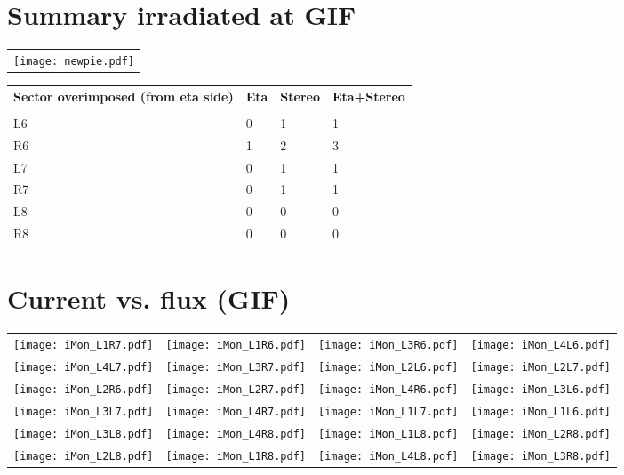 \documentclass{article}%
\begin{document}
%
\section*{Summary irradiated at GIF}%
\label{sec:Summary irradiated at GIF}%
\begin{longtabu}{X[c]}%
\texttt{[image: newpie.pdf]}\\%
\end{longtabu}%
\renewcommand{\arraystretch}{1.5}%
\begin{longtabu}{X[l] X[r] X[r] X[r]}%
%
\textbf{Sector overimposed (from eta side)}&\textbf{Eta}&\textbf{Stereo}&\textbf{Eta+Stereo}\\%
&&&\\%
\hline%
%
L6&0&1&1\\%
R6&1&2&3\\%
%
L7&0&1&1\\%
R7&0&1&1\\%
%
L8&0&0&0\\%
R8&0&0&0\\%
\end{longtabu}

%
\newpage%
\section*{Current vs. flux (GIF)}%
\label{sec:Current vs. flux (GIF)}%
\begin{longtabu}{X[c] X[c] X[c] X[c]}%
\texttt{[image: iMon\_L1R7.pdf]}&\texttt{[image: iMon\_L1R6.pdf]}&\texttt{[image: iMon\_L3R6.pdf]}&\texttt{[image: iMon\_L4L6.pdf]}\\%
\texttt{[image: iMon\_L4L7.pdf]}&\texttt{[image: iMon\_L3R7.pdf]}&\texttt{[image: iMon\_L2L6.pdf]}&\texttt{[image: iMon\_L2L7.pdf]}\\%
\texttt{[image: iMon\_L2R6.pdf]}&\texttt{[image: iMon\_L2R7.pdf]}&\texttt{[image: iMon\_L4R6.pdf]}&\texttt{[image: iMon\_L3L6.pdf]}\\%
\texttt{[image: iMon\_L3L7.pdf]}&\texttt{[image: iMon\_L4R7.pdf]}&\texttt{[image: iMon\_L1L7.pdf]}&\texttt{[image: iMon\_L1L6.pdf]}\\%
\texttt{[image: iMon\_L3L8.pdf]}&\texttt{[image: iMon\_L4R8.pdf]}&\texttt{[image: iMon\_L1L8.pdf]}&\texttt{[image: iMon\_L2R8.pdf]}\\%
\texttt{[image: iMon\_L2L8.pdf]}&\texttt{[image: iMon\_L1R8.pdf]}&\texttt{[image: iMon\_L4L8.pdf]}&\texttt{[image: iMon\_L3R8.pdf]}\\%
\end{longtabu}

%
\end{document}
